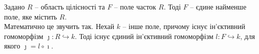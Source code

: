 \documentclass{math_library}
\begin{document}
\begin{theorem}
\label{field_of_fractions_the_smallest}
Задано $R$ -- область цілісності та $F$ -- поле часток $R$. Тоді $F$ -- єдине найменше поле, яке містить $R$.\\
Математично це звучить так. Нехай $k$ -- інше поле, причому існує ін'єктивний гомоморфізм $\jmath \colon R \hookrightarrow k$. Тоді існує єдиний ін'єктивний гомоморфізм $l \colon F \hookrightarrow k$, для якого $\jmath = l \circ \imath$.
\begin{figure}[H]
\centering
{}
\end{figure}
\end{theorem}
\end{document}
